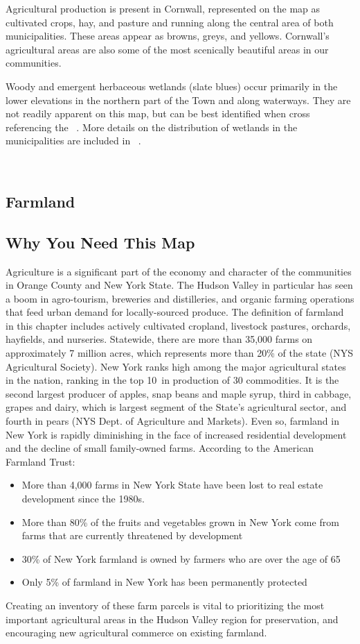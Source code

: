Agricultural production is present in Cornwall, represented on the map as 
cultivated crops, hay, and pasture and running along the central area of both 
municipalities. These areas appear as browns, greys, and yellows. Cornwall's 
agricultural areas are also some of the most scenically beautiful areas in our 
communities. 
\par
Woody and emergent herbaceous wetlands (slate blues) occur primarily in the 
lower elevations in the northern part of the Town and along waterways. They are 
not readily apparent on this map, but can be best identified when cross 
referencing the ~. More details on the distribution 
of wetlands in the municipalities are included in ~.


~\label{map:landcover}
\subsection{Farmland}\label{subsec:farmland}
\subsection*{Why You Need This Map}
Agriculture is a significant part of the economy and character of the
communities in Orange County and New York State. The Hudson Valley in
particular has seen a boom in agro-tourism, breweries and distilleries, and
organic farming operations that feed urban demand for locally-sourced produce.
The definition of farmland in this chapter includes actively cultivated
cropland, livestock pastures, orchards, hayfields, and nurseries. Statewide,
there are more than 35,000 farms on approximately 7 million acres, which
represents more than 20\% of the state (NYS Agricultural Society). New York
ranks high among the major agricultural states in the nation, ranking in the
top 10\ in production of 30 commodities. It is the second largest producer of
apples, snap beans and maple syrup, third in cabbage, grapes and dairy, which
is largest segment of the State's agricultural sector, and fourth in pears (NYS
Dept. of Agriculture and Markets). Even so, farmland in New York is rapidly
diminishing in the face of increased residential development and the decline of
small family-owned farms. According to the American Farmland Trust:
\begin{itemize}
    \item More than 4,000 farms in New York State have been lost to real estate
    development since the 1980s.
    \item More than 80\% of the fruits and vegetables grown in New York come 
    from farms that are currently threatened by development
    \item 30\% of New York farmland is owned by farmers who are over the age of 
    65
    \item Only 5\% of farmland in New York has been permanently protected
\end{itemize}
Creating an inventory of these farm parcels is vital to prioritizing the most 
important agricultural areas in the Hudson Valley region for preservation, and 
encouraging new agricultural commerce on existing farmland.

